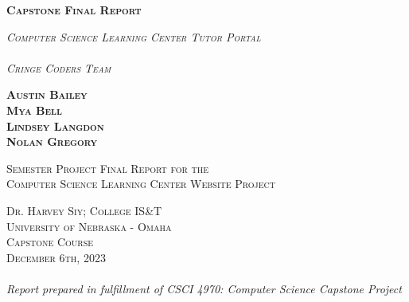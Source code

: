\documentclass[oneside,openany,obeyspaces]{book}
\newcommand\TeamName{Cringe Coders Team}
\begin{document}
\begin{titlepage}
    \begin{center}
        \vspace*{0.25cm}
        \begin{huge}
            \textsc{\textbf{Capstone Final Report}}
        \end{huge}

        \vspace{0.5cm}

        \begin{Large}
            \textsc{\textit{Computer Science Learning Center Tutor Portal}}\\~\\
            \textsc{\textit{\TeamName}}
        \end{Large}

        \vspace{1.5cm}

        \textsc{
            \textbf{Austin Bailey}\\
            \textbf{Mya Bell}\\
            \textbf{Lindsey Langdon}\\
            \textbf{Nolan Gregory}
        }

        \vfill

        \textsc{Semester Project Final Report for the\\
            Computer Science Learning Center Website Project\\}

        \vspace{0.8cm}

        \textsc{Dr. Harvey Siy; College IS\&T\\
            University of Nebraska - Omaha\\
            Capstone Course\\
            December 6th, 2023}\\~\\

        \textit{Report prepared in fulfillment of CSCI 4970: Computer Science Capstone Project}
    \end{center}
\end{titlepage}

\tableofcontents
\end{document}
